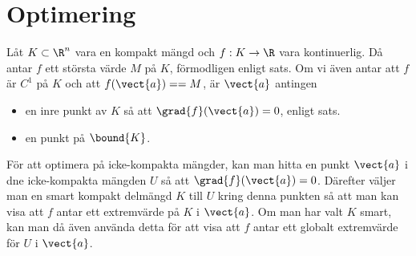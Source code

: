 \section{Optimering}
Låt $K\subset\R^n$ vara en kompakt mängd och $f: K\to\R$ vara kontinuerlig. Då antar $f$ ett största värde $M$ på $K$, förmodligen enligt sats. Om vi även antar att $f$ är $C^1$ på $K$ och att $f(\vect{a})= = M$, är $\vect{a}$ antingen
\begin{itemize}
	\item en inre punkt av $K$ så att $\grad{f} (\vect{a}) = 0$, enligt sats.
	\item en punkt på $\bound{K}$.
\end{itemize}

För att optimera på icke-kompakta mängder, kan man hitta en punkt $\vect{a}$ i dne icke-kompakta mängden $U$ så att $\grad{f} (\vect{a}) = 0$. Därefter väljer man en smart kompakt delmängd $K$ till $U$ kring denna punkten så att man kan visa att $f$ antar ett extremvärde på $K$ i $\vect{a}$. Om man har valt $K$ smart, kan man då även använda detta för att visa att $f$ antar ett globalt extremvärde för $U$ i $\vect{a}$.